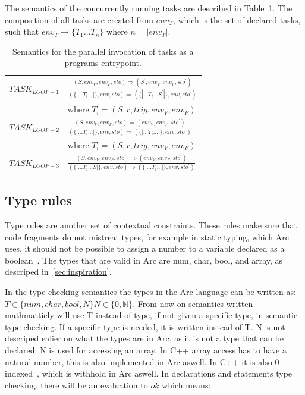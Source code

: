 The semantics of the concurrently running tasks are described in Table~\ref{tab:taskinvocation}. The composition of all tasks are created from $env_T$, which is the set of declared tasks, such that $env_T \rightarrow \{T_1 \dots T_n \}$ where $n = |env_T|$.


\begin{table}[htb!]
    \centering
    \begin{tabular}{ll}
        \toprule
        $TASK_{LOOP-1}$ & $\frac
            {(S, env_V, env_F, sto) \Rightarrow (S^\prime, env_V, env_F, sto^\prime)}
            {(\{|\dots T_i \dots|\}, env, sto) \Rightarrow (\{|\dots T_i \dots S^\prime|\}, env, sto^\prime)}$ \\ [12pt]
                        & where $T_i = (S, r, trig, env_V, env_F)$                                             \\ [12pt]
        $TASK_{LOOP-2}$ & $\frac
            {(S, env_V, env_F, sto) \Rightarrow (env_V, env_F, sto^\prime)}
            {(\{|\dots T_i \dots|\}, env, sto) \Rightarrow (\{|\dots T_i \dots|\}, env, sto^\prime)}$          \\ [12pt]
                        & where $T_i = (S, r, trig, env_V, env_F)$                                             \\ [12pt]
        $TASK_{LOOP-3}$ & $\frac
            {(S, env_V, env_F, sto) \Rightarrow (env_V, env_F, sto^\prime)}
            {(\{|\dots T_i \dots S|\}, env, sto) \Rightarrow (\{|\dots T_i \dots|\}, env, sto^\prime)}$        \\
        \bottomrule
    \end{tabular}
    \caption{Semantics for the parallel invocation of tasks as a programs entrypoint.}
    \label{tab:taskinvocation}
\end{table}



\subsection{Type rules}\label{subsec:typerules}
Type rules are another set of contextual constraints. These rules make sure that code fragments do not mistreat types, for example in static typing, which Arc uses, it should not be possible to assign a number to a variable declared as a boolean~\cite{Sebesta2016}. The types that are valid in Arc are num, char, bool, and array, as descriped in~\ref{sec:inspiration}.

In the type checking semantics the types in the Arc language can be written as:
$T \in \{num, char, bool, N\} N \in \{ 0,\mathbb{N}\}$.
From now on semantics written mathmatticly will use T instead of type, if not given a specific type, in semantic type checking. If a specific type is needed, it is written instead of T.
N is not descriped ealier on what the types are in Arc, as it is not a type that can be declared. N is used for accessing an array, In C++ array access has to have a natural number, this is also implemented in Arc aswell. In C++ it is also 0-indexed~\cite{cppreferenceDataTypes}, which is withhold in Arc aswell.
In declarations and statements type checking, there will be an evaluation to $ok$ which means:

